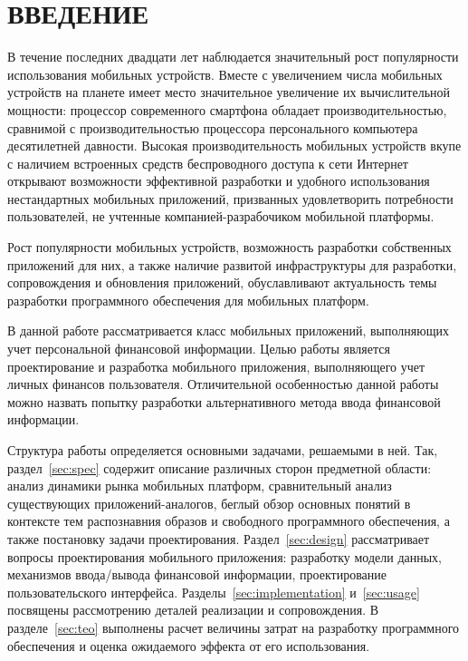 \section*{ВВЕДЕНИЕ}

В течение последних двадцати лет наблюдается значительный рост
популярности использования мобильных устройств.
Вместе с увеличением числа мобильных устройств на планете имеет место
значительное увеличение их вычислительной мощности:
процессор современного смартфона обладает производительностью,
сравнимой с производительностью процессора персонального
компьютера десятилетней давности.
Высокая производительность мобильных устройств вкупе с наличием
встроенных средств беспроводного доступа к {\color{red} сети Интернет} открывают
возможности эффективной разработки и удобного использования
нестандартных мобильных приложений, призванных удовлетворить
потребности пользователей, не учтенные компанией-разрабочиком
мобильной платформы.

Рост популярности мобильных устройств, возможность разработки собственных
приложений для них, а также наличие развитой инфраструктуры для разработки,
сопровождения и обновления приложений, обуславливают актуальность темы
разработки программного обеспечения для мобильных платформ.

В данной работе рассматривается класс мобильных приложений,
выполняющих учет персональной финансовой информации.
Целью работы является проектирование и разработка мобильного приложения,
выполняющего учет личных финансов пользователя.
Отличительной особенностью данной работы можно назвать попытку разработки
альтернативного метода ввода финансовой информации.

Структура работы определяется основными задачами, решаемыми в ней.
Так, раздел~\ref{sec:spec} содержит описание различных сторон предметной области:
анализ динамики рынка мобильных платформ, сравнительный анализ существующих
приложений-аналогов, беглый обзор основных понятий в контексте тем распознавния
образов и свободного программного обеспечения, а также постановку задачи проектирования.
Раздел~\ref{sec:design} рассматривает вопросы проектирования мобильного приложения:
разработку модели данных, механизмов ввода/вывода финансовой информации,
проектирование пользовательского интерфейса.
Разделы~\ref{sec:implementation} и~\ref{sec:usage} посвящены рассмотрению деталей
реализации и сопровождения. В разделе~\ref{sec:teo} выполнены расчет
величины затрат на разработку программного обеспечения и оценка ожидаемого эффекта
от его использования.
